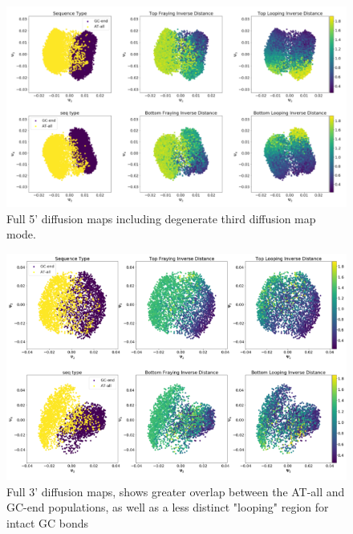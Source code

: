 \documentclass[journal=jpcbfk,manuscript=article]{achemso}
\begin{document}
\begin{figure}[ht!]
	\begin{center}
        \includegraphics[width=\textwidth]{Figs/figs_imp/GC-end_dmaps_full.PNG}
        \caption{Full 5' diffusion maps including degenerate third diffusion map mode.}
        \label{fig:GC-end_dmaps_full}
	\end{center}
\end{figure}

\begin{figure}[ht!]
	\begin{center}
        \includegraphics[width=\textwidth]{Figs/figs_imp/GC-end_dmaps_3prime.PNG}
        \caption{Full 3' diffusion maps, shows greater overlap between the AT-all and GC-end populations, as well as a less distinct "looping" region for intact GC bonds}
        \label{fig:GC-end_dmaps_3prime}
	\end{center}
\end{figure}
\end{document}
